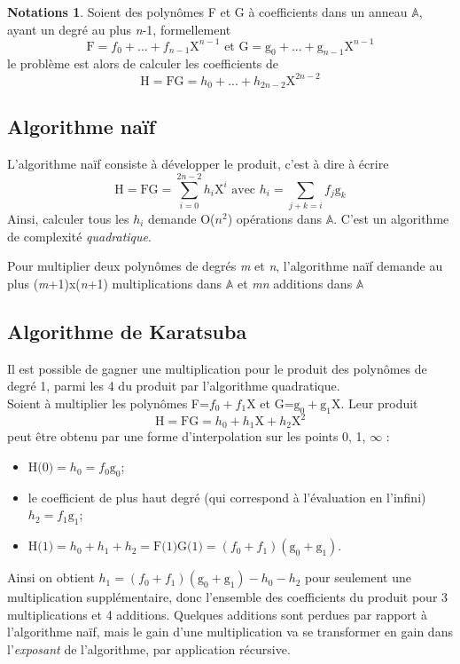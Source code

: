 \documentclass[a4paper]{article}
\begin{document}
\theoremstyle{definition}
\newtheorem*{nt}{Notations}
\begin{nt}
Soient des polynômes F et G à coefficients dans un anneau $\mathbb{A}$, ayant un degré au plus \textit{n}-1, formellement
\[
\text{F}=f_0+...+f_{n-1}\mathrm{X}^{n-1}\text{ et G}=\mathrm{g}_0+...+\mathrm{g}_{n-1}\mathrm{X}^{n-1}
\]
le problème est alors de calculer les coefficients de 
\[
\text{H}=\text{FG}=h_0+...+h_{2n-2}\mathrm{X}^{2n-2}    
\]
\end{nt}
\bigskip
\subsection{Algorithme naïf}
L'algorithme naïf consiste à développer le produit, c'est à dire à écrire
\[\text{H}=\text{FG}=\sum_{i=0}^{2n-2}h_{i}\mathrm{X}^i\text{ avec }h_i=\sum_{j+k=i}f_j\mathrm{g}_k    \]
Ainsi, calculer tous les $h_i$ demande O($n^2$) opérations dans $\mathbb{A}$. C'est un algorithme de complexité \textit{quadratique}.

\bigskip
Pour multiplier deux polynômes de degrés \textit{m} et \textit{n}, l'algorithme naïf demande au plus (\textit{m}+1)\textsf{x}(\textit{n}+1) multiplications dans $\mathbb{A}$ et
\textit{mn} additions dans $\mathbb{A}$
\bigskip
\subsection{Algorithme de Karatsuba}
Il est possible de gagner une multiplication pour le produit des polynômes de degré 1, parmi les 4 du produit par l'algorithme quadratique.
\\Soient à multiplier les polynômes F=$f_0+f_1\mathrm{X}$ et G=$\mathrm{g}_0+\mathrm{g}_1\mathrm{X}$. Leur produit 
\[\text{H}=\text{FG}=h_0+h_1\mathrm{X}+h_2\mathrm{X}^2\] 
peut être obtenu par une forme d'interpolation sur les points 0, 1, $\infty$ :\\

\begin{itemize}
    \item $\text{H(0)}=h_0=f_0\mathrm{g}_0$;
    \item le coefficient de plus haut degré (qui correspond à l'évaluation en l'infini) $h_2=f_1\mathrm{g}_1$;
    \item $\text{H(1)}=h_0+h_1+h_2=\text{F(1)G(1)}=(f_0+f_1)(\mathrm{g}_0+\mathrm{g}_1)$.
\end{itemize}

Ainsi on obtient $h_1=(f_0+f_1)(\mathrm{g}_0+\mathrm{g}_1)-h_0-h_2$
pour seulement une multiplication supplémentaire, donc l'ensemble des coefficients du produit pour 3 multiplications et 4 additions.
Quelques additions sont perdues par rapport à l'algorithme naïf, mais le gain d'une multiplication va se transformer en gain dans l'\textit{exposant} de l'algorithme, par application récursive.
\end{document}
